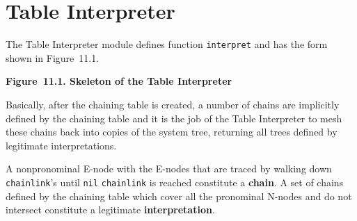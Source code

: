 \documentclass{article}
\begin{document}
\bigbreak
\begin{minipage}{\textwidth}
\end{minipage}
\bigbreak

%
%

\section{Table Interpreter}

The Table Interpreter module defines function \texttt{interpret}
and has the form shown in Figure~11.1.

\bigbreak
\begin{minipage}{\textwidth}
\vbox{}
\bigbreak
{}
\textbf{Figure~11.1. Skeleton of the Table Interpreter}
\end{minipage}
\bigbreak

Basically, after the chaining table is created, a number of
chains are implicitly defined by the chaining table and it is
the job of the Table Interpreter to mesh these chains back into
copies of the system tree, returning all trees defined by
legitimate interpretations.

A nonpronominal E-node with the E-nodes that are traced by
walking down \texttt{chainlink}'s until \texttt{nil}
\texttt{chainlink} is reached constitute a
 \textbf{chain}. A set of chains defined by the
chaining table which cover all the pronominal N-nodes and do not
intersect constitute a legitimate 
\textbf{interpretation}.
\end{document}
